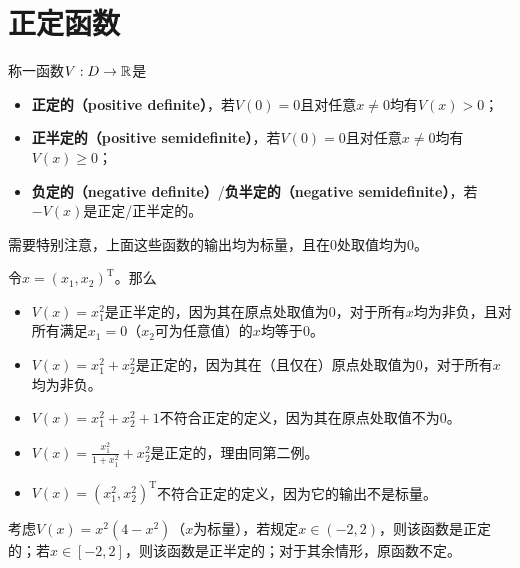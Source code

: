 \section{正定函数}\label{2Bref}
\begin{definition}\label{def:posdef}
  称一函数$V:D\to\mathbb{R}$是\begin{itemize}[leftmargin=1em]
    \item {\bf 正定的（positive definite）}，若$V(0)=0$且对任意$x\ne 0$均有$V(x)>0$；
    \item {\bf 正半定的（positive semidefinite）}，若$V(0)=0$且对任意$x\ne 0$均有$V(x)\ge0$；
    \item {\bf 负定的（negative definite）}/{\bf 负半定的（negative semidefinite）}，若$-V(x)$是正定/正半定的。
  \end{itemize}
\end{definition}
\begin{note}
  需要特别注意，上面这些函数的输出均为标量，且在$0$处取值均为$0$。
\end{note}
\begin{example}[正定、正半定函数]
  令$x=(x_1,x_2)^\mathrm{T}$。那么
  \begin{itemize}[leftmargin=1em]
    \item $V(x)=x_1^2$是正半定的，因为其在原点处取值为$0$，对于所有$x$均为非负，且对所有满足$x_1=0$（$x_2$可为任意值）的$x$均等于$0$。
    \item $V(x)=x_1^2+x_2^2$是正定的，因为其在（且仅在）原点处取值为$0$，对于所有$x$均为非负。
    \item $V(x)=x_1^2+x_2^2+1$不符合正定的定义，因为其在原点处取值不为$0$。
    \item $V(x)=\frac{x_1^2}{1+x_1^2}+x_2^2$是正定的，理由同第二例。
    \item $V(x)=(x_1^2,x_2^2)^\mathrm{T}$不符合正定的定义，因为它的输出不是标量。
  \end{itemize}
\end{example}

\begin{example}[局部正定函数]
  考虑$V(x)=x^2(4-x^2)$（$x$为标量），若规定$x\in(-2,2)$，则该函数是正定的；若$x\in[-2,2]$，则该函数是正半定的；对于其余情形，原函数不定。
\end{example}

